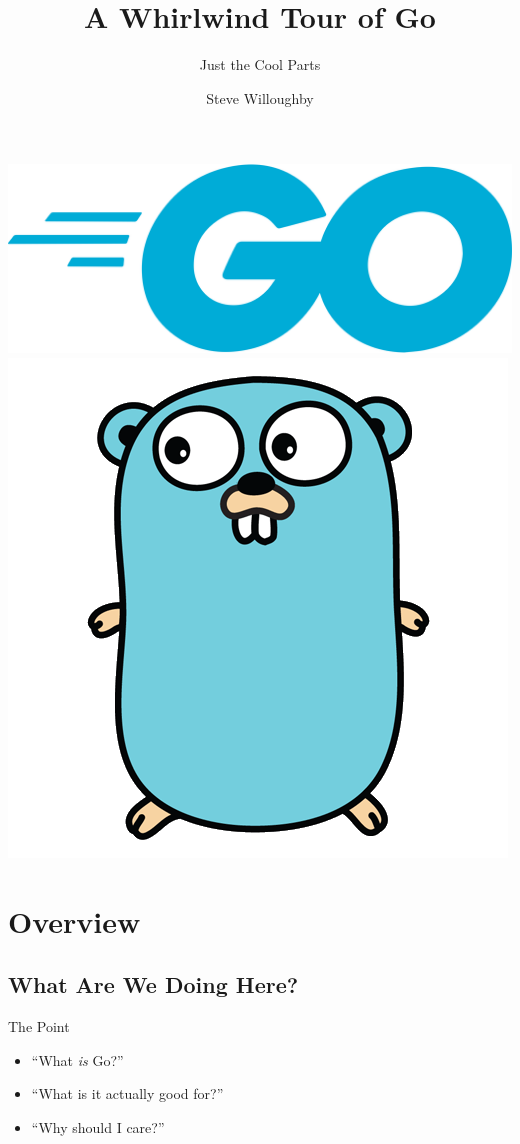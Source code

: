\documentclass[pdf]{beamer}
\title{A Whirlwind Tour of Go}
\subtitle{Just the Cool Parts}
\author{Steve Willoughby}
\begin{document}
\begin{frame}
	\titlepage
	\begin{center}
	\includegraphics[height=.25\textheight]{go-logo}
	\includegraphics[height=.25\textheight]{gopher}
	\end{center}
\end{frame}
\section[Overview]{Overview}
\subsection{What Are We Doing Here?}
\begin{frame}{The Point}
	\begin{itemize}
		\item ``What \emph{is} Go?''
		\item ``What is it actually good for?''
		\item ``Why should I care?''
	\end{itemize}
\end{frame}
\end{document}
